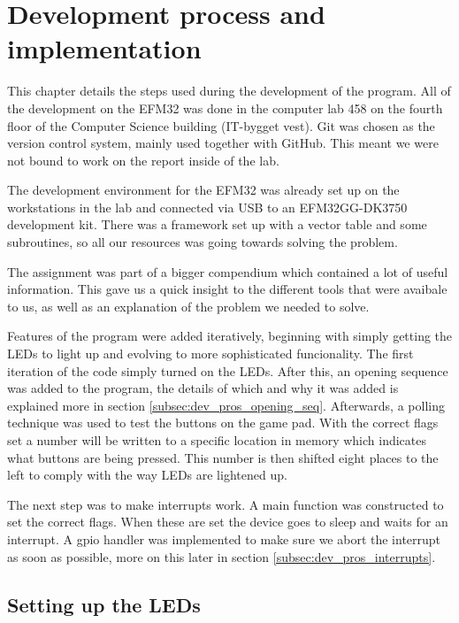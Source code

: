 \section{Development process and implementation}
\label{chap:development_process}

This chapter details the steps used during the development of the program. All of the development on the EFM32 was done in the computer lab 458 on the fourth floor of the Computer Science building (IT-bygget vest). Git was chosen as the version control system, mainly used together with GitHub. This meant we were not bound to work on the report inside of the lab.

The development environment for the EFM32 was already set up on the workstations in the lab and connected via USB to an EFM32GG-DK3750 development kit. There was a framework set up with a vector table and some subroutines, so all our resources was going towards solving the problem.

The assignment was part of a bigger compendium which contained a lot of useful information. This gave us a quick insight to the different tools that were avaibale to us, as well as an explanation of the problem we needed to solve.

Features of the program were added iteratively, beginning with simply getting the LEDs to light up and evolving to more sophisticated funcionality. The first iteration of the code simply turned on the LEDs. After this, an opening sequence was added to the program, the details of which and why it was added is explained more in section \ref{subsec:dev_pros_opening_seq}. Afterwards, a polling technique was used to test the buttons on the game pad. With the correct flags set a number will be written to a specific location in memory which indicates what buttons are being pressed. This number is then shifted eight places to the left to comply with the way LEDs are lightened up.

The next step was to make interrupts work. A main function was constructed to set the correct flags. When these are set the device goes to sleep and waits for an interrupt. A gpio handler was implemented to make sure we abort the interrupt as soon as possible, more on this later in section \ref{subsec:dev_pros_interrupts}.

\subsection{Setting up the LEDs}
\label{subsec:dev_pros_setup_led}

